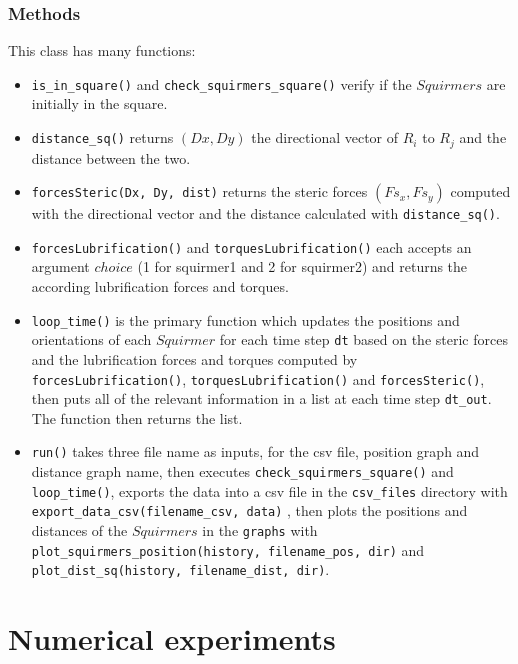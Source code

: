 \documentclass{article}
\begin{document}
\subsubsection*{Methods}
This class has many functions:
\begin{itemize}
   \item \texttt{is\_in\_square()} and \texttt{check\_squirmers\_square()} verify if the $Squirmers$ 
    are initially in the square.
   \item \texttt{distance\_sq()} returns $(Dx, Dy)$ the directional vector of $R_{i}$ to $R_{j}$ 
   and the distance between the two.
   \item \texttt{forcesSteric(Dx, Dy, dist)} returns the steric forces $(Fs_x, Fs_y)$ computed with the directional vector and the distance calculated with \texttt{distance\_sq()}.
   \item \texttt{forcesLubrification()} and \texttt{torquesLubrification()} each accepts an argument $choice$ (1 for squirmer1 and 2 for squirmer2)
   and returns the according lubrification forces and torques.
   \item \texttt{loop\_time()} is the primary function which updates the positions and orientations of each $Squirmer$
   for each time step \texttt{dt} based on the steric forces and the lubrification forces and torques computed by \texttt{forcesLubrification()}, 
   \texttt{torquesLubrification()} and \texttt{forcesSteric()}, then puts all of the relevant information in a list
   at each time step \texttt{dt\_out}. The function then returns the list.
   \item \texttt{run()} takes three file name as inputs, for the csv file, position graph and distance graph name, 
   then executes \texttt{check\_squirmers\_square()} and \texttt{loop\_time()},
   exports the data into a csv file in the \texttt{csv\_files} directory with \texttt{export\_data\_csv(filename\_csv, data)} 
   , then plots the positions and distances of the $Squirmers$ in the \texttt{graphs} with \texttt{plot\_squirmers\_position(history, filename\_pos, dir)}
   and \texttt{plot\_dist\_sq(history, filename\_dist, dir)}.
\end{itemize}

\section{Numerical experiments}
\end{document}
